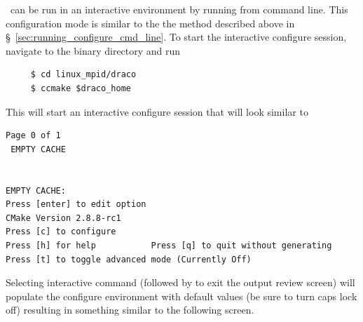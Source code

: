 \cmake\ can be run in an interactive environment by running  from command line.  This configuration mode is similar to the the method described above in \S~\ref{sec:running_configure_cmd_line}.  To start the interactive configure session, navigate to the binary directory and run 
\begin{verbatim}
     $ cd linux_mpid/draco
     $ ccmake $draco_home
\end{verbatim}
This will start an interactive configure session that will look similar to 
\begin{lstlisting}[basicstyle=\footnotesize, xleftmargin=0.0in, xrightmargin=0.0in]
                                                     Page 0 of 1
 EMPTY CACHE


EMPTY CACHE:                                                                              
Press [enter] to edit option                                       CMake Version 2.8.8-rc1
Press [c] to configure
Press [h] for help           Press [q] to quit without generating
Press [t] to toggle advanced mode (Currently Off)
\end{lstlisting}
Selecting interactive command \comp{[c]} (followed by \comp{[e]} to exit the output review screen) 
will populate the configure environment with default values (be sure to turn caps lock off) resulting in something similar to the following screen.
